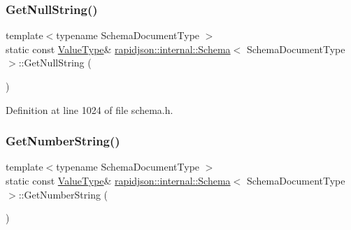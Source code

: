 \subsubsection{\texorpdfstring{GetNullString()}{GetNullString()}}
{\footnotesize\ttfamily template$<$typename Schema\+Document\+Type $>$ \\
static const \mbox{\hyperlink{classrapidjson_1_1internal_1_1_schema_a3979a9083c598195927c08c6e3ba91d1}{Value\+Type}}\& \mbox{\hyperlink{classrapidjson_1_1internal_1_1_schema}{rapidjson\+::internal\+::\+Schema}}$<$ Schema\+Document\+Type $>$\+::Get\+Null\+String (\begin{DoxyParamCaption}{ }\end{DoxyParamCaption})\hspace{0.3cm}{\ttfamily [static]}}



Definition at line 1024 of file schema.\+h.


\begin{DoxyCode}{0}

\end{DoxyCode}
\mbox{\label{classrapidjson_1_1internal_1_1_schema_a86d57b8fe17ab5f909ca4d775244fae1}} 
\subsubsection{\texorpdfstring{GetNumberString()}{GetNumberString()}}
{\footnotesize\ttfamily template$<$typename Schema\+Document\+Type $>$ \\
static const \mbox{\hyperlink{classrapidjson_1_1internal_1_1_schema_a3979a9083c598195927c08c6e3ba91d1}{Value\+Type}}\& \mbox{\hyperlink{classrapidjson_1_1internal_1_1_schema}{rapidjson\+::internal\+::\+Schema}}$<$ Schema\+Document\+Type $>$\+::Get\+Number\+String (\begin{DoxyParamCaption}{ }\end{DoxyParamCaption})\hspace{0.3cm}{\ttfamily [static]}}



